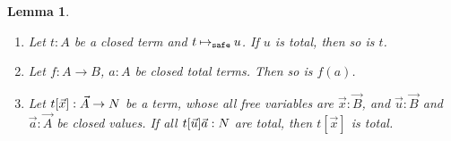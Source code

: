 \documentclass{article}
\newtheorem{lemma}[theorem]{Lemma}
\begin{document}
\begin{lemma}\label{lem:total_value}
  \begin{enumerate}
  \item\label{lem:total_value1}
    Let $t:A$ be a closed term and $t \mathbin{{\mapsto}_{\tiny \tt safe}} u$.
    If $u$ is total, then so is $t$.
  \item\label{lem:total_value1bis}
    Let $f:A \rightarrow B$, $a:A$ be closed \emph{total} terms.
    Then so is $f(a)$.
  \item\label{lem:total_value2}
    Let $t[\vec{x}]:\vec{A}\rightarrow{N}$ be a term,
    whose all free variables are $\vec{x}:\vec{B}$,
    and $\vec{u}:\vec{B}$ and $\vec{a}:\vec{A}$ be closed values.
    If all $t[\vec{u}]\vec{a}:{N}$ are total, then $t[\vec{x}]$ is total. 
  \end{enumerate}
\end{lemma}
\end{document}
